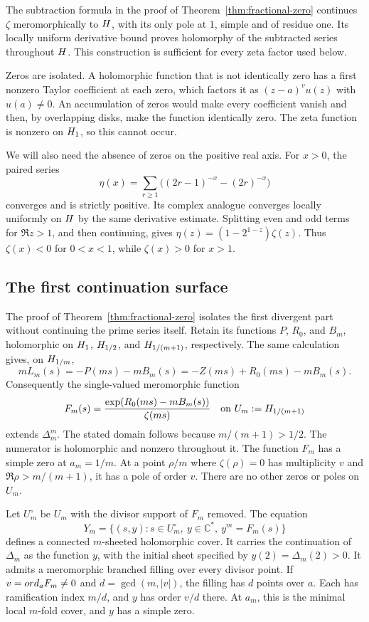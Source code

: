 The subtraction formula in the proof of
Theorem~\ref{thm:fractional-zero} continues \(\zeta\) meromorphically
to \(H\), with its only pole at \(1\), simple and of residue one.
Its locally uniform derivative bound proves holomorphy of the subtracted
series throughout \(H\).  This construction is sufficient for every
zeta factor used below.

Zeros are isolated.  A holomorphic function that is not identically zero
has a first nonzero Taylor coefficient at each zero, which factors it as
\((z-a)^v u(z)\) with \(u(a)\ne0\).  An accumulation of zeros would
make every coefficient vanish and then, by overlapping disks, make the
function identically zero.  The zeta function is nonzero on \(H_1\),
so this cannot occur.

We will also need the absence of zeros on the positive real axis.
For \(x>0\), the paired series
\[
 \eta(x)=\sum_{r\geq1}\bigl((2r-1)^{-x}-(2r)^{-x}\bigr)
\]
converges and is strictly positive.  Its complex analogue converges
locally uniformly on \(H\) by the same derivative estimate.
Splitting even and odd terms for \(\Re z>1\), and then continuing,
gives \(\eta(z)=(1-2^{1-z})\zeta(z)\).
Thus \(\zeta(x)<0\) for \(0<x<1\), while \(\zeta(x)>0\) for \(x>1\).

\subsection{The first continuation surface}

The proof of Theorem~\ref{thm:fractional-zero} isolates the first
divergent part without continuing the prime series itself.
Retain its functions \(P\), \(R_0\), and \(B_m\), holomorphic on
\(H_1\), \(H_{1/2}\), and \(H_{1/(m+1)}\), respectively.
The same calculation gives, on \(H_{1/m}\),
\[
 mL_m(s)=-P(ms)-mB_m(s)
 =-Z(ms)+R_0(ms)-mB_m(s).
\]
Consequently the single-valued meromorphic function
\[
 F_m(s)=\frac{\exp(R_0(ms)-mB_m(s))}{\zeta(ms)}
 \quad\text{on }U_m:=H_{1/(m+1)}
\]
extends \(\Delta_m^m\).  The stated domain follows because
\(m/(m+1)>1/2\).  The numerator is holomorphic and nonzero throughout it.
The function \(F_m\) has a simple zero at \(a_m=1/m\).
At a point \(\rho/m\) where \(\zeta(\rho)=0\) has multiplicity \(v\)
and \(\Re\rho>m/(m+1)\), it has a pole of order \(v\).
There are no other zeros or poles on \(U_m\).

\begin{theorem}
\label{thm:first-surface}
Let \(U_m^\circ\) be \(U_m\) with the divisor support of \(F_m\)
removed.  The equation
\[
 Y_m=\{(s,y):s\in U_m^\circ,\ y\in\mathbb C^*,\ y^m=F_m(s)\}
\]
defines a connected \(m\)-sheeted holomorphic cover.
It carries the continuation of \(\Delta_m\) as the function \(y\),
with the initial sheet specified by \(y(2)=\Delta_m(2)>0\).
It admits a meromorphic branched filling over every divisor point.
If \(v=ord_a F_m\ne0\) and \(d=\gcd(m,|v|)\), the filling has
\(d\) points over \(a\).  Each has ramification index \(m/d\), and
\(y\) has order \(v/d\) there.
At \(a_m\), this is the minimal local \(m\)-fold cover, and \(y\)
has a simple zero.
\end{theorem}

